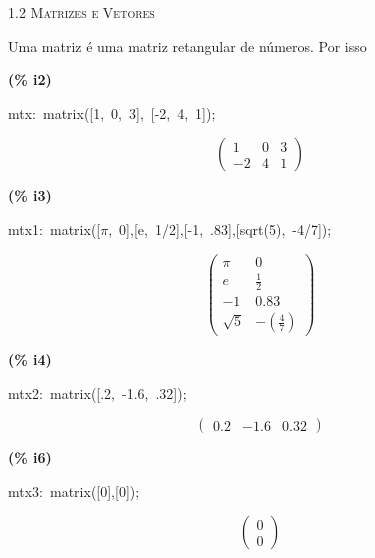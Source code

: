 \documentclass[fleqn]{article}
\begin{document}
\pagebreak{}
{\Huge {\scshape 1.2 Matrizes e Vetores}}
\setcounter{section}{0}
\setcounter{subsection}{0}
\setcounter{figure}{0}

Uma matriz é uma matriz retangular de números. Por isso


\noindent
\begin{minipage}[t]{4.000000em}\color{red}\bfseries
(\% i2)	
\end{minipage}
\begin{minipage}[t]{\textwidth}\color{blue}
mtx:\ matrix([1,\ 0,\ 3],\ [-2,\ 4,\ 1]);
\end{minipage}
\[\displaystyle \tag{mtx} 
\begin{pmatrix}1 & 0 & 3\\
\mathop{-}2 & 4 & 1\end{pmatrix}\mbox{}
\]


\noindent
\begin{minipage}[t]{4.000000em}\color{red}\bfseries
(\% i3)	
\end{minipage}
\begin{minipage}[t]{\textwidth}\color{blue}
mtx1:\ matrix([\ensuremath{\pi},\ 0],[e,\ 1/2],[-1,\ .83],[sqrt(5),\ -4/7]);
\end{minipage}
\[\displaystyle \tag{mtx1} 
\begin{pmatrix}\ensuremath{\pi}  & 0\\
e & \frac{1}{2}\\
\mathop{-}1 & 0.83\\
\sqrt{5} & \mathop{-}\left( \frac{4}{7}\right) \end{pmatrix}\mbox{}
\]


\noindent
\begin{minipage}[t]{4.000000em}\color{red}\bfseries
(\% i4)	
\end{minipage}
\begin{minipage}[t]{\textwidth}\color{blue}
mtx2:\ matrix([.2,\ -1.6,\ .32]);
\end{minipage}
\[\displaystyle \tag{mtx2} 
\begin{pmatrix}0.2 & \mathop{-}1.6 & 0.32\end{pmatrix}\mbox{}
\]


\noindent
\begin{minipage}[t]{4.000000em}\color{red}\bfseries
(\% i6)	
\end{minipage}
\begin{minipage}[t]{\textwidth}\color{blue}
mtx3:\ matrix([0],[0]);
\end{minipage}
\[\displaystyle \tag{mtx3} 
\begin{pmatrix}0\\
0\end{pmatrix}\mbox{}
\]
\end{document}
